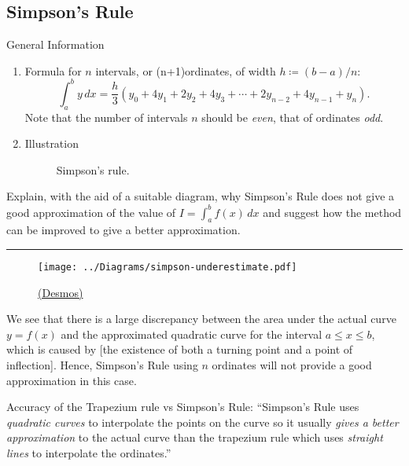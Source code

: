 \documentclass[oneside]{book}
\begin{document}
    \subsection{Simpson's Rule}
    \begin{stbox}{General Information}
      \begin{enumerate}
        \item Formula for \(n\) intervals, or (n+1)ordinates, of width \(h\coloneq (b-a)/n\):
        \[\int_{a}^{b}y\,dx=\frac{h}{3}(y_0+4y_1+2y_2+4y_3+\cdots+2y_{n-2}+4y_{n-1}+y_n).\]
        Note that the number of intervals \(n\) should be \emph{even}, that of ordinates \emph{odd}.
        \item Illustration
        \begin{figure}[H]
          \centering
          
          \caption{Simpson's rule.}
          \label{fig:simpson's-rule}
        \end{figure}
      \end{enumerate}
    \end{stbox}
    \begin{example}{}{}
      Explain, with the aid of a suitable diagram, why Simpson's Rule does not give a good approximation of the value of \(I=\int_{a}^{b}f(x)\,dx\) and suggest how the method can be improved to give a better approximation.

      \rule{20cm-137.0549pt-25pt}{0.05mm}

      \begin{figure}[H]
        \centering
        \texttt{[image: ../Diagrams/simpson-underestimate.pdf]}
        \caption{\href{https://www.desmos.com/calculator/wxxs9ypjkf}{(Desmos)}}
        \label{fig:simpson's-rule-overestimate-prelims}
      \end{figure}
      We see that there is a large discrepancy between the area under the actual curve \(y=f(x)\) and the approximated quadratic curve for the interval \(a\leq x\leq b\), which is caused by [the existence of both a turning point and a point of inflection]. Hence, Simpson's Rule using \(n\) ordinates will not provide a good approximation in this case.
    \end{example}
    \begin{note}
      Accuracy of the Trapezium rule vs Simpson's Rule:
      ``Simpson's Rule uses \emph{quadratic curves} to interpolate the points on the curve so it usually \emph{gives a better approximation} to the actual curve than the trapezium rule which uses \emph{straight lines} to interpolate the ordinates.''
    \end{note}
\end{document}
